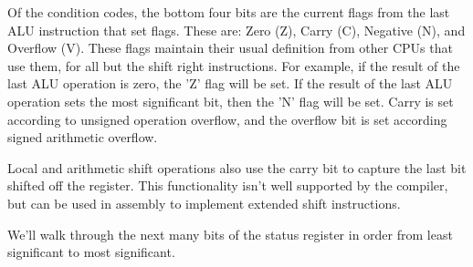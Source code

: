 \documentclass{gqtekspec}
\begin{document}
Of the condition codes, the bottom four bits are the current flags from the
last ALU instruction that set flags.  These are:
		Zero (Z),
		Carry (C),
		Negative (N),
		and Overflow (V).
These flags maintain their usual definition from other CPUs that use them, for
all but the shift right instructions.  For example, if the result of the last
ALU operation is zero, the 'Z' flag will be set.  If the result of the last
ALU operation sets the most significant bit, then the 'N' flag will be set.
Carry is set according to unsigned operation overflow, and the overflow bit
is set according signed arithmetic overflow.

Local and arithmetic shift operations also use the carry bit to capture the
last bit shifted off the register.  This functionality isn't well supported
by the compiler, but can be used in assembly to implement extended shift
instructions.

We'll walk through the next many bits of the status register in order from
least significant to most significant.
\end{document}
